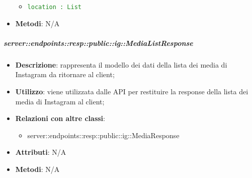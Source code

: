 \begin{itemize}
\begin{itemize}
        \item \textcolor{forestgreen}{\texttt{location : List}}
      \end{itemize}
    \item \textbf{Metodi}: N/A
      \end{itemize}

    \subparagraph{server::endpoints::resp::public::ig::MediaListResponse} %
    \label{subp:bdsm_app_server_endpoints_resp_public_ig_medialistresponse}
    \begin{itemize}
      \item \textbf{Descrizione}: rappresenta il modello dei dati della lista dei media di Instagram da ritornare al client;
      \item \textbf{Utilizzo}: viene utilizzata dalle API per restituire la response della lista dei media di Instagram al client;
      \item \textbf{Relazioni con altre classi}:
        \begin{itemize}
          \item server::endpoints::resp::public::ig::MediaResponse
        \end{itemize}
    \item \textbf{Attributi}: N/A
    \item \textbf{Metodi}: N/A
      \end{itemize}

